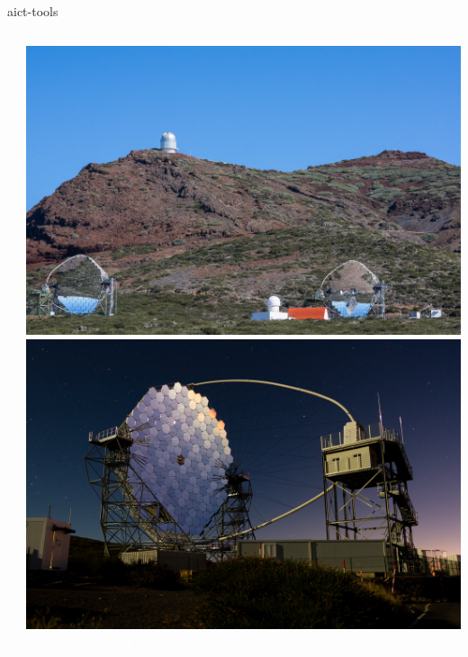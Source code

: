 \documentclass[aspectratio=1610, 9pt]{beamer}
\begin{document}
\begin{frame}[c]{aict-tools}
\begin{columns}[onlytextwidth, c]
\begin{column}{0.65\textwidth}
\begin{center}
      \end{center}
    \end{column}
    \hfill
    \begin{column}{0.3\textwidth}
      \includegraphics[width=\linewidth]{images/magic.jpg}\\[0.5\baselineskip]
      \includegraphics[width=\linewidth]{images/lst.jpg}\\[-1.5\baselineskip]
      \textcolor{white}{\hspace{0.5em}\small [Otger Ballester (IFAE)]}%
    \end{column}
  \end{columns}

  \vspace{0.5\baselineskip}
  \begin{center}
    \small{}
  \end{center}
\end{frame}
\end{document}
